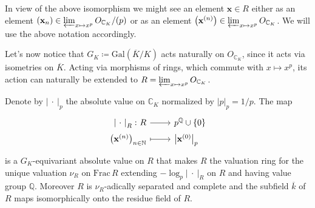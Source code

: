 \begin{ntt}[]\label{not:tiltingElts}
	In view of the above isomorphism we might see an element $\mathbf{x} \in R$
	either as an element 
	$\left( \mathbf{x}_n \right) \in \varprojlim_{x \mapsto x^p} O_{\mathbb{C}_K}/ (p)$
	or as an element
	$\left( \mathbf{x}^{(n)} \right) \in \varprojlim_{x \mapsto x^p} O_{\mathbb{C}_K}$.
	We will use the above notation accordingly.
\end{ntt}


\begin{rem}[]\label{rem:GKActionR}
	Let's now notice that $G_K \coloneqq \mathrm{Gal}\left( \overline{K} / K \right)$
	acts naturally on $O_{\mathbb{C}_K}$, since it acts via isometries on
	$\overline{K}$.
	Acting via morphisms of rings, which commute with $x \mapsto x^p$,
	its action can naturally be extended to
	$R = \varprojlim_{x \mapsto x^p} O_{\mathbb{C}_K}$.
\end{rem}


\begin{lem}
	Denote by $\left| \ \cdot \ \right|_p$ the absolute value on $\mathbb{C}_K$
	normalized by $\left| p \right|_p = 1/p$.
	The map
	\begin{equation*}
	\begin{tikzcd}[row sep = 0ex
		,/tikz/column 1/.append style={anchor=base east}
		,/tikz/column 2/.append style={anchor=base west}]
		\left| \ \cdot \ \right|_R\colon R \arrow[r, "", rightarrow] &
		p^{\mathbb{Q}} \cup \left\{ 0 \right\} \\
		\left( \mathbf{x}^{(n)} \right)_{n \in \mathbb{N}} \arrow[r, "", mapsto] & 
		\left| \mathbf{x}^{(0)} \right|_p
	\end{tikzcd}
	\end{equation*} 
	is a $G_K$-equivariant absolute value on $R$ that makes
	$R$ the valuation ring for the unique valuation
	$\nu_R$ on $\mathrm{Frac}\, R$ extending
	$-\log_p \left| \ \cdot \ \right|_R$ on $R$
	and having value group $\mathbb{Q}$.
	Moreover $R$ is $\nu_R$-adically separated and complete
	and the subfield $\overline{k}$ of $R$ maps
	isomorphically onto the residue field of $R$.
\end{lem} 


